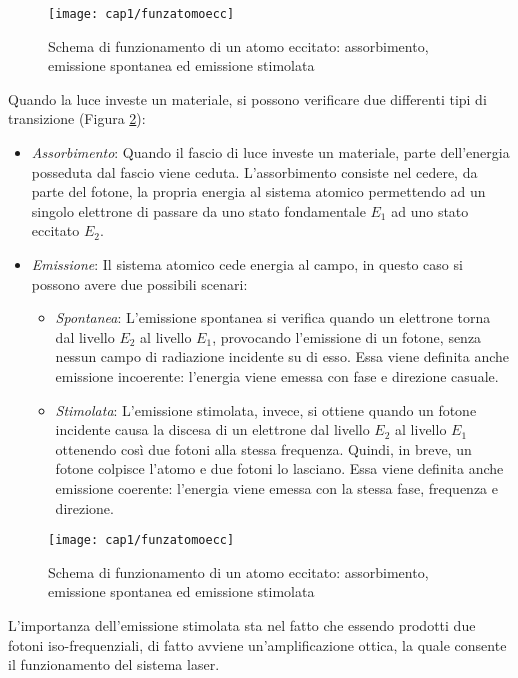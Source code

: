 \begin{figure}
  \begin{center}
    \texttt{[image: cap1/funzatomoecc]}
    \caption{Schema di funzionamento di un atomo eccitato: assorbimento, emissione spontanea ed emissione stimolata}
    \label{funzatomoecc}
  \end{center}
\end{figure}

Quando la luce investe un materiale, si possono verificare due differenti tipi di transizione (Figura \ref{funzatomoecc}):
\begin{itemize}
	\item \emph{Assorbimento}: Quando il fascio di luce investe un materiale, parte dell'energia posseduta dal fascio viene ceduta. L'assorbimento consiste nel cedere, da parte del fotone, la propria energia al sistema atomico permettendo ad un singolo elettrone di passare da uno stato fondamentale $E_{1}$ ad uno stato eccitato $E_{2}$.
	\item \emph{Emissione}: Il sistema atomico cede energia al campo, in questo caso si possono avere due possibili scenari:
	\begin{itemize}
		\item \emph{Spontanea}: L'emissione spontanea si verifica quando un elettrone torna dal livello $E_{2}$ al livello $E_{1}$, provocando l'emissione di un fotone, senza nessun campo di radiazione incidente su di esso. Essa viene definita anche emissione incoerente: l'energia viene emessa con fase e direzione casuale.
		\item \emph{Stimolata}: L'emissione stimolata, invece, si ottiene quando un fotone incidente causa la discesa di un elettrone dal livello $E_{2}$ al livello $E_{1}$ ottenendo così due fotoni alla stessa frequenza. Quindi, in breve, un fotone colpisce l'atomo e due fotoni lo lasciano. Essa viene definita anche emissione coerente: l'energia viene emessa con la stessa fase, frequenza e direzione.
	\end{itemize} 
\end{itemize}
\begin{figure}[H]
  \begin{center}
    \texttt{[image: cap1/funzatomoecc]}
    \caption{Schema di funzionamento di un atomo eccitato: assorbimento, emissione spontanea ed emissione stimolata}
    \label{funzatomoecc}
  \end{center}
\end{figure}
L'importanza dell'emissione stimolata sta nel fatto che essendo prodotti due fotoni iso-frequenziali, di fatto avviene un'amplificazione ottica, la quale consente il funzionamento del sistema laser.

